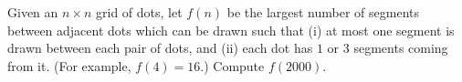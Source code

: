 Given an $n\times n$ grid of dots, let $f(n)$ be the largest number of segments between adjacent dots which can be drawn such that (i) at most one segment is drawn between each pair of dots, and (ii) each dot has $1$ or $3$ segments coming from it.  (For example, $f(4)=16$.) Compute $f(2000)$.
